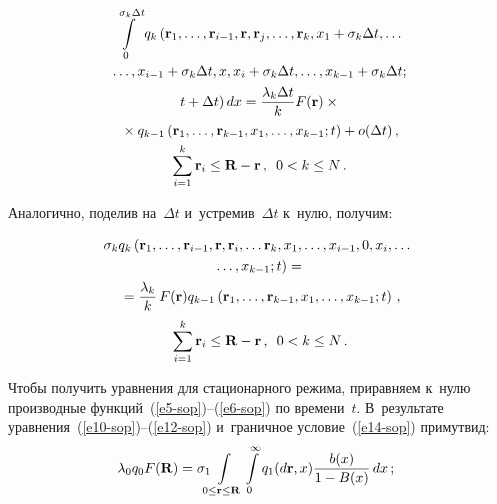 \begin{multicols}{2}
\vspace*{-3pt}

\noindent
  \begin{multline*}
  \int\limits_0^{\sigma_k \Delta t} q_k\left( \mathbf{r}_1, \ldots,  
\mathbf{r}_{i-1}, \mathbf{r}, \mathbf{r}_j,\ldots , \mathbf{r}_k, x_1+\sigma_k 
\Delta t,\ldots\right.\\[-1pt]
\ldots, x_{i-1}+\sigma_k \Delta t, x, x_i+\sigma_k\Delta t,\ldots,  
x_{k-1}+\sigma_k \Delta t;\\
\left. t+\Delta t\right)dx=\displaystyle\frac{\displaystyle \lambda_k\Delta t\mathstrut}{\displaystyle k\mathstrut}F(\mathbf{r})\times{}\\[-1pt]
{}\times q_{k-1}\left( \mathbf{r}_1, \ldots, 
\mathbf{r}_{k-1}, x_1, \ldots, x_{k-1};t\right)+o(\Delta t)\,,\\[-1pt]
  \sum\limits^k_{i=1} \mathbf{r}_i\leq \mathbf{R}-\mathbf{r}\,,\enskip
   0<k\leq 
N\,.
  \end{multline*}

Аналогично, поделив на~$\Delta t$ и~устремив~$\Delta t$ к~нулю, получим:

\pagebreak

\noindent
\begin{multline}
\!\!\sigma_k q_k\left( \mathbf{r}_1, \ldots, \mathbf{r}_{i-1}, \mathbf{r}, 
\mathbf{r}_i, \ldots \mathbf{r}_k, x_1, \ldots, x_{i-1},0, x_i, \ldots\right.\\
\left.\ldots,  
x_{k-1};t\right)={}\\
{}= \displaystyle\frac{\displaystyle \lambda_k\mathstrut}{\displaystyle k\mathstrut}\,F(\mathbf{r})q_{k-1} \left(\mathbf{r}_1, \ldots,  
\mathbf{r}_{k-1}, x_1,\ldots, x_{k-1};t\right)\,,\\
\sum\limits^k_{i=1}\mathbf{r}_i\leq \mathbf{R}-\mathbf{r}\,,\enskip 0<k\leq N\,.
\label{e14-sop}
\end{multline}
  
  Чтобы получить уравнения для стационарного режима, приравняем к~нулю 
производные функций~(\ref{e5-sop})--(\ref{e6-sop}) по времени~$t$. 
В~результате уравнения~(\ref{e10-sop})--(\ref{e12-sop}) и~граничное 
условие~(\ref{e14-sop}) примут\linebreak вид:
  \begin{equation}
  \hspace*{-3mm}\lambda_0 q_0 F(\mathbf{R}) =\sigma_1 \hspace*{-2mm}\int\limits_{0\leq \mathbf{r}\leq 
\mathbf{R}} \int\limits_0^\infty q_1(d\mathbf{r},x)\fr{b(x)}{1-B(x)}\,dx\,;\!\!
  \label{e15-sop}
  \end{equation}
  

\end{multicols}
